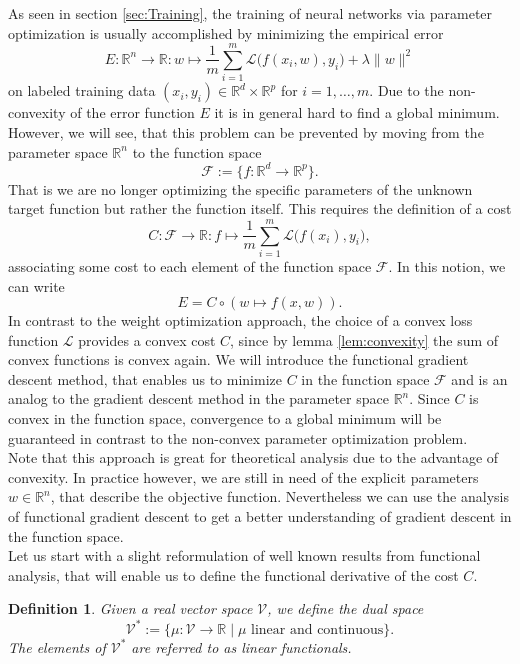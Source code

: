 \documentclass[11pt, a4paper]{article}
\newtheorem{definition}[theorem]{Definition}
\newcommand{\R}{\mathds{R}}
\newcommand{\F}{\mathcal{F}}
\renewcommand{\L}{\mathcal{L}}
\begin{document}
As seen in section \ref{sec:Training}, the training of neural networks via parameter optimization is usually accomplished by minimizing the empirical error
\[ E : \R^n \to \R : w \mapsto \frac{1}{m} \sum_{i=1}^{m} \L \big ( f(x_i,w),y_i \big) + \lambda \| w \|^2 \]
on labeled training data $(x_i,y_i) \in \R^d \times \R^p$ for $i=1, \dots, m$. Due to the non-convexity of the error function $E$ it is in general hard to find a global minimum. However, we will see, that this problem can be prevented by moving from the parameter space $\R^n$ to the function space
\[ \F:= \Big \{ f: \R^d \to \R^p \Big \}. \]
That is we are no longer optimizing the specific parameters of the unknown target function but rather the function itself. This requires the definition of a cost
\[ C: \F \to \R : f \mapsto \frac{1}{m} \sum_{i=1}^{m} \L \big ( f(x_i),y_i \big), \]
associating some cost to each element of the function space $\F$.  In this notion, we can write
\[ E = C \circ (w \mapsto f(x,w)). \]
In contrast to the weight optimization approach, the choice of a convex loss function $\L$ provides a convex cost $C$, since by lemma \ref{lem:convexity} the sum of convex functions is convex again. We will introduce the functional gradient descent method, that enables us to minimize $C$ in the function space $\F$ and is an analog to the gradient descent method in the parameter space $\R^n$. Since $C$ is convex in the function space, convergence to a global minimum will be guaranteed in contrast to the non-convex parameter optimization problem. \\

Note that this approach is great for theoretical analysis due to the advantage of convexity. In practice however, we are still in need of the explicit parameters $w \in \R^n$, that describe the objective function. Nevertheless we can use the analysis of functional gradient descent to get a better understanding of gradient descent in the function space. \\

Let us start with a slight reformulation of well known results from functional analysis, that will enable us to define the functional derivative of the cost $C$.

\begin{definition}
Given a real vector space $\mathcal{V}$, we define the dual space
\[ \mathcal{V}^* := \Big \{ \mu : \mathcal{V} \to \R \mid \mu \text{ linear and continuous} \Big \}. \]
The elements of $\mathcal{V}^*$ are referred to as linear functionals.
\end{definition}
\end{document}
